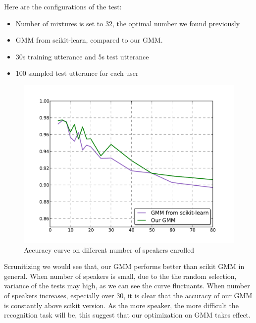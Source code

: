 Here are the configurations of the test:
\begin{itemize}
	\item Number of mixtures is set to 32, the optimal number we found previously
	\item GMM from scikit-learn, compared to our GMM.
	\item 30s training utterance and 5s test utterance
	\item 100 sampled test utterance for each user
\end{itemize}

\begin{figure}[!ht]
	\label{fig:nspk_enrolled}
	\centering
	\includegraphics[width=\linewidth]{res/nperson.pdf}
	\caption{Accuracy curve on different number of speakers enrolled}
\end{figure}

Scrunitizing  we would see that, our GMM performs better than
scikit GMM in general. When number of speakers is small, due to the the random
selection, variance of the tests may high, as we can see the curve fluctuants.
When number of speakers increases, especially over 30, it is clear that the
accuracy of our GMM is constantly above scikit version. As the more speaker,
the more difficult the recognition task will be, this suggest that our
optimization on GMM takes effect.


